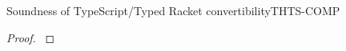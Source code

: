 \documentclass[acmlarge, anonymous, authordraft, review]{acmart} %
\begin{document}
\begin{lemma}{Soundness of TypeScript/Typed Racket convertibility}{THTS-COMP}
  \begin{conds}
    \cond{$\EnvTypeS\Env\K\e\t$}
    \cond{$\ep = \TRG{\e}\Env$}
    \cond{$\TR\K = \Kp$}
    \cond{$\TR\Env = \Envp$}
    \cond{$\EnvType\Envp\cdot\Kp{\ep}{\t}$}
  \end{conds}
  \then\axiom{$\EnvType\Envp\cdot\Kp{\TAG\e\Env{\tp}}{\tp}$}

  \begin{proof}{ }
% 
% 
% 
% 
  \end{proof}
\end{lemma}
\end{document}
